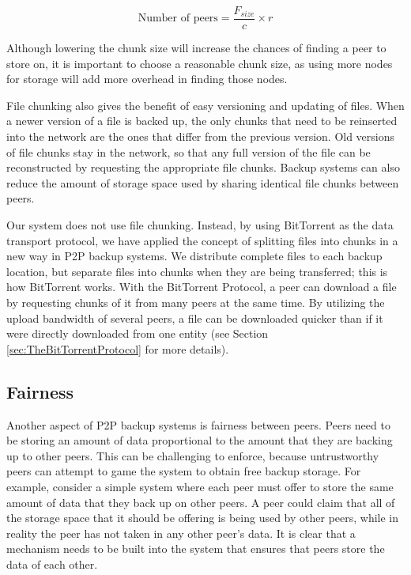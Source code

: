 \documentclass[12pt]{report}
\begin{document}
\begin{equation} \label{equ:file_chunk_peers}
\text{Number of peers} = \frac{F_{size}}{c} \times r
\end{equation}

Although lowering the chunk size will increase the chances of finding a peer to store on, it is important to choose a reasonable chunk size, as using more nodes for storage will add more overhead in finding those nodes.

File chunking also gives the benefit of easy versioning and updating of files. When a newer version of a file is backed up, the only chunks that need to be reinserted into the network are the ones that differ from the previous version. Old versions of file chunks stay in the network, so that any full version of the file can be reconstructed by requesting the appropriate file chunks. Backup systems can also reduce the amount of storage space used by sharing identical file chunks between peers.

Our system does not use file chunking. Instead, by using BitTorrent as the data transport protocol, we have applied the concept of splitting files into chunks in a new way in P2P backup systems. We distribute complete files to each backup location, but separate files into chunks when they are being transferred; this is how BitTorrent works. With the BitTorrent Protocol, a peer can download a file by requesting chunks of it from many peers at the same time. By utilizing the upload bandwidth of several peers, a file can be downloaded quicker than if it were directly downloaded from one entity (see Section \ref{sec:TheBitTorrentProtocol} for more details).

\subsection{Fairness} \label{sec:BackgroundFairness}
Another aspect of P2P backup systems is fairness between peers. Peers need to be storing an amount of data proportional to the amount that they are backing up to other peers. This can be challenging to enforce, because untrustworthy peers can attempt to game the system to obtain free backup storage. For example, consider a simple system where each peer must offer to store the same amount of data that they back up on other peers. A peer could claim that all of the storage space that it should be offering is being used by other peers, while in reality the peer has not taken in any other peer's data. It is clear that a mechanism needs to be built into the system that ensures that peers store the data of each other.
\end{document}
